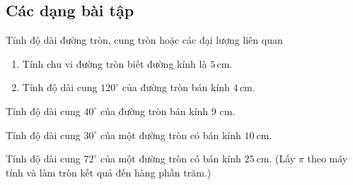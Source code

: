 \subsection{Các dạng bài tập}
\begin{dang}{Tính độ dài đường tròn, cung tròn hoặc các đại lượng liên quan}
\end{dang}	
\begin{vd}%
	\begin{enumerate}
	\item Tính chu vi đường tròn biết đường kính là $5\, \mathrm{cm}$.
	\item Tính độ dài cung $120^{\circ}$ của đường tròn bán kính $4\, \mathrm{cm}$. 
	\end{enumerate}	
\end{vd}
\begin{vd}
	Tính độ dài cung $40^{\circ}$ của đường tròn bán kính $9$ cm.
\end{vd}
\begin{vd}
	Tính độ dài cung $30^{\circ}$ của một đường tròn có bán kính $10 \mathrm{~cm}$.
\end{vd}
\begin{vd}
	Tính độ dài cung $72^{\circ}$ của một đường tròn có bán kính $25 \mathrm{~cm}$. (Lấy $\pi$ theo máy tính và làm tròn kết quả đến hàng phần trăm.)
\end{vd}
